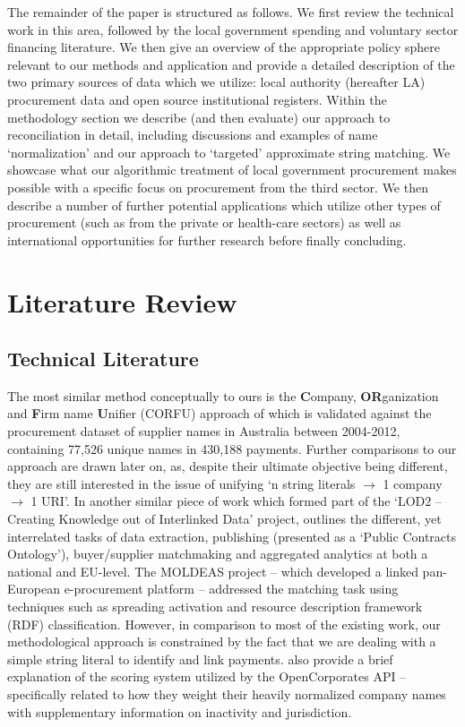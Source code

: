 \documentclass[12pt]{article}
\begin{document}
The remainder of the paper is structured as follows. We first review the technical work in this area, followed by the local government spending and voluntary sector financing literature. We then give an overview of the appropriate policy sphere relevant to our methods and application and provide a detailed description of the two primary sources of data which we utilize: local authority (hereafter LA) procurement data and open source institutional registers. Within the methodology section we describe (and then evaluate) our approach to reconciliation in detail, including discussions and examples of name `normalization' and our approach to `targeted' approximate string matching. We showcase what our algorithmic treatment of local government procurement makes possible with a specific focus on procurement from the third sector. We then describe a number of further potential applications which utilize other types of procurement (such as from the private or health-care sectors) as well as international opportunities for further research before finally concluding. 

\section{Literature Review}\label{litreview}

\subsection{Technical Literature}

The most similar method conceptually to ours is the \textbf{C}ompany, \textbf{OR}ganization and \textbf{F}irm name \textbf{U}nifier (CORFU) approach of \cite{corfu2015} which is validated against the procurement dataset of supplier names in Australia between 2004-2012, containing 77,526 unique names in 430,188 payments. Further comparisons to our approach are drawn later on, as, despite their ultimate objective being different, they are still interested in the issue of unifying `n string literals $\rightarrow$ 1 company $\rightarrow$ 1 URI'. In another similar piece of work which formed part of the `LOD2 -- Creating Knowledge out of Interlinked Data’ project, \cite{Svatek2014} outlines the different, yet interrelated tasks of data extraction, publishing (presented as a `Public Contracts Ontology'), buyer/supplier matchmaking and aggregated analytics at both a national and EU-level. The MOLDEAS project -- which developed a linked pan-European e-procurement platform \citep[outlined in][]{moldeas2012} -- addressed the matching task using techniques such as spreading activation and resource description framework (RDF) classification. However, in comparison to most of the existing work, our methodological approach is constrained by the fact that we are dealing with a simple string literal to identify and link payments. \cite{OCref} also provide a brief explanation of the scoring system utilized by the OpenCorporates API -- specifically related to how they weight their heavily normalized company names with supplementary information on inactivity and jurisdiction.
\end{document}
